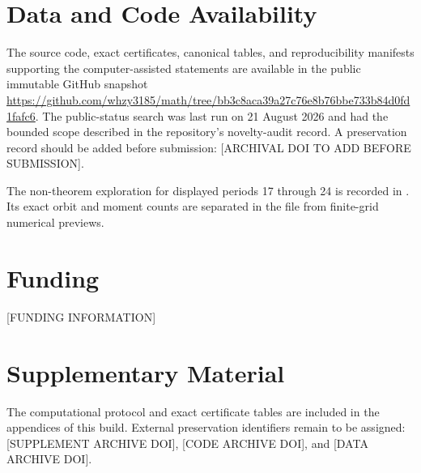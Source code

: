 \section*{Data and Code Availability}
The source code, exact certificates, canonical tables, and reproducibility
manifests supporting the computer-assisted statements are available in the
public immutable GitHub snapshot
\url{https://github.com/whzy3185/math/tree/bb3c8aca39a27c76e8b76bbe733b84d0fd1fafc6}.
The public-status search was last run on 21 August 2026 and had the bounded
scope described in the repository's novelty-audit record. A preservation
record should be added before submission: [ARCHIVAL DOI TO ADD BEFORE
SUBMISSION].

The non-theorem exploration for displayed periods 17 through 24 is recorded in
\allowbreak{}. Its exact orbit and
moment counts are separated in the file from finite-grid numerical previews.

\section*{Funding}
[FUNDING INFORMATION]

\section*{Supplementary Material}
The computational protocol and exact certificate tables are included in the
appendices of this build. External preservation identifiers remain to be
assigned: [SUPPLEMENT ARCHIVE DOI], [CODE ARCHIVE DOI], and [DATA ARCHIVE DOI].
